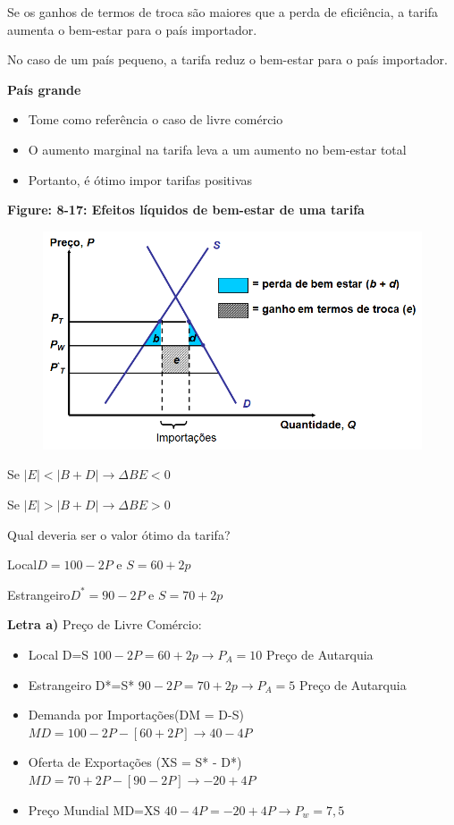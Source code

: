 \documentclass[a4paper,12pt]{article}[abntex2]
\begin{document}
Se os ganhos de termos de troca são maiores que a perda de eficiência, a tarifa aumenta o bem-estar para o país importador.

No caso de um país pequeno, a tarifa reduz o bem-estar para o país importador.

\textbf{País grande}
\begin{itemize}
  \item Tome como referência o caso de livre comércio
  \item O aumento marginal na tarifa leva a um aumento no bem-estar total
  \item Portanto, é ótimo impor tarifas positivas
\end{itemize}

\textbf{Figure: 8-17: Efeitos líquidos de bem-estar de uma tarifa}
\begin{figure}[H]
    \centering
    \includegraphics[width=0.75\linewidth]{Imagens/a21i6.png}
\end{figure}

Se \(|E|<|B+D|\rightarrow\Delta BE<0\)

Se \(|E|>|B+D|\rightarrow\Delta BE>0\)

Qual deveria ser o valor ótimo da tarifa?

Local\(D=100-2P\) e \(S=60+2p\)

Estrangeiro\(D^*=90-2P\) e \(S=70+2p\)

\textbf{Letra a)} Preço de Livre Comércio:\begin{itemize}
    \item Local D=S \(100-2P=60+2p \rightarrow P_A=10\) Preço de Autarquia
    \item Estrangeiro D*=S* \(90-2P=70+2p \rightarrow P_A=5\) Preço de Autarquia
    \item Demanda por Importações(DM = D-S) \(MD = 100 - 2P - [60+2P]\rightarrow40-4P\)
    \item Oferta de Exportações (XS = S* - D*) \(MD = 70 + 2P - [90-2P]\rightarrow-20+4P\)
    \item Preço Mundial MD=XS \(40-4P=-20+4P \rightarrow P_w=7,5\)
\end{itemize}
\end{document}

